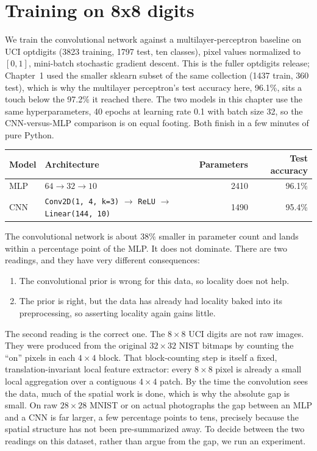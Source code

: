 
\section{Training on 8x8 digits}\label{sec:conv-digits}

We train the convolutional network against a multilayer-perceptron baseline on
UCI optdigits (3823 training, 1797 test, ten classes), pixel values normalized
to $[0, 1]$, mini-batch stochastic gradient descent. This is the fuller optdigits
release; Chapter~1 used the smaller sklearn subset of the same collection (1437
train, 360 test), which is why the multilayer perceptron's test accuracy here,
96.1\%, sits a touch below the 97.2\% it reached there. The two models in this
chapter use the same hyperparameters, 40 epochs at learning rate 0.1 with batch
size 32, so the CNN-versus-MLP comparison is on equal footing. Both finish in a
few minutes of pure Python.

\begin{center}
\begin{tabular}{@{}llrr@{}}
\toprule
Model & Architecture & Parameters & Test accuracy \\
\midrule
MLP & $64 \to 32 \to 10$ & 2410 & 96.1\% \\
CNN & \texttt{Conv2D(1, 4, k=3)} $\to$ \texttt{ReLU} $\to$ \texttt{Linear(144, 10)}
    & 1490 & 95.4\% \\
\bottomrule
\end{tabular}
\end{center}

The convolutional network is about 38\% smaller in parameter count and lands
within a percentage point of the MLP. It does not dominate. There are two
readings, and they have very different consequences:
\begin{enumerate}
\item The convolutional prior is wrong for this data, so locality does not
  help.
\item The prior is right, but the data has already had locality baked into its
  preprocessing, so asserting locality again gains little.
\end{enumerate}

The second reading is the correct one. The $8 \times 8$ UCI digits are not raw
images. They were produced from the original $32 \times 32$ NIST bitmaps by
counting the ``on'' pixels in each $4 \times 4$ block. That block-counting step
is itself a fixed, translation-invariant local feature extractor: every $8
\times 8$ pixel is already a small local aggregation over a contiguous $4
\times 4$ patch. By the time the convolution sees the data, much of the spatial
work is done, which is why the absolute gap is small. On raw $28 \times 28$
MNIST or on actual photographs the gap between an MLP and a CNN is far larger,
a few percentage points to tens, precisely because the spatial structure has
not been pre-summarized away. To decide between the two readings on this
dataset, rather than argue from the gap, we run an experiment.

